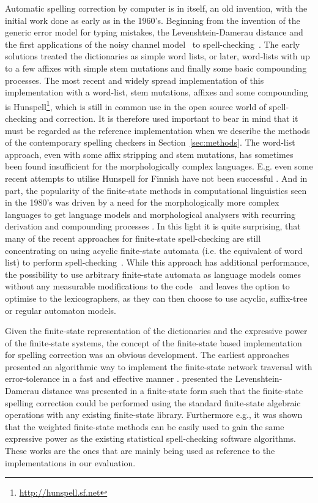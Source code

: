 \documentclass[a4paper,12pt]{article}
\begin{document}
Automatic spelling correction by computer is in itself, an old invention, with
the initial work done as early as in the 1960's. Beginning from the invention
of the generic error model for typing mistakes, the Levenshtein-Damerau
distance \cite[]{levenshtein/1966,damerau/1964} and the first applications of
the noisy channel model~\cite[]{shannon/1948} to
spell-checking~\cite[]{raviv/1967}.  The early solutions treated the
dictionaries as simple word lists, or later, word-lists with up to a few
affixes with simple stem mutations and finally some basic compounding
processes. The most recent and widely spread implementation of this
implementation with a word-list, stem mutations, affixes and some compounding
is Hunspell\footnote{\url{http://hunspell.sf.net}}, which is still in common
use in the open source world of spell-checking and correction.  It is therefore
used important to bear in mind that it must be regarded as the reference
implementation when we describe the methods of the contemporary spelling
checkers in Section~\ref{sec:methods}. The word-list approach, even with some
affix stripping and stem mutations, has sometimes been found insufficient for
the morphologically complex languages.  E.g. even some recent attempts to
utilise Hunspell for Finnish have not been successful \cite[]{pitkanen/2006}.
And in part, the popularity of the finite-state methods in computational
linguistics seen in the 1980's was driven by a need for the morphologically
more complex languages to get language models and morphological analysers with
recurring derivation and compounding processes
\cite[]{beesley2004morphological}.  In this light it is quite surprising, that
many of the recent approaches for finite-state spell-checking are still
concentrating on using acyclic finite-state automata (i.e. the equivalent of
word list) to perform
spell-checking~\cite[]{watson2003new,deorowicz2005correcting}. While this
approach has additional performance, the possibility to use arbitrary
finite-state automata as language models comes without any measurable
modifications to the code~\cite[e.g.][]{pirinen/2010/lrec} and leaves the
option to optimise to the lexicographers, as they can then choose to use
acyclic, suffix-tree or regular automaton models.

Given the  finite-state representation of the dictionaries and the expressive
power of the finite-state systems, the concept of the finite-state based
implementation for spelling correction was an obvious development. The earliest
approaches presented an algorithmic way to implement the finite-state network
traversal with error-tolerance \cite[]{oflazer/1996} in a fast and effective
manner \cite[]{agata/2002,hulden/2009}. \cite{schulz/2002} presented the
Levenshtein-Damerau distance was presented in a finite-state form such that the
finite-state spelling correction could be performed using the standard
finite-state algebraic operations with any existing finite-state library.
Furthermore e.g.,  \cite{pirinen/2010/lrec} it was shown that the
weighted finite-state methods can be easily used to gain the same expressive
power as the existing statistical spell-checking software algorithms. These
works are the ones that are mainly being used as reference to the
implementations in our evaluation.
\end{document}
